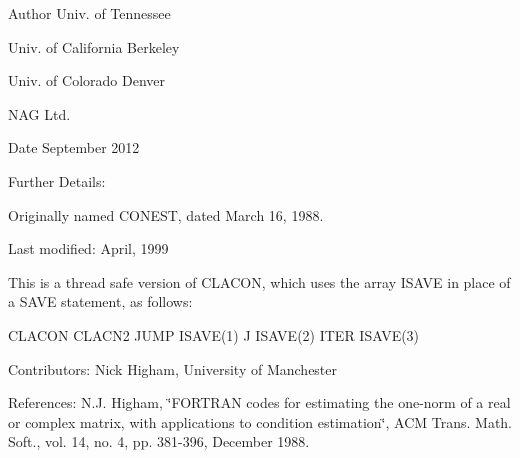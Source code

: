 \begin{DoxyAuthor}{Author}
Univ. of Tennessee 

Univ. of California Berkeley 

Univ. of Colorado Denver 

N\+A\+G Ltd. 
\end{DoxyAuthor}
\begin{DoxyDate}{Date}
September 2012 
\end{DoxyDate}
\begin{DoxyParagraph}{Further Details\+: }
\begin{DoxyVerb}  Originally named CONEST, dated March 16, 1988.

  Last modified:  April, 1999

  This is a thread safe version of CLACON, which uses the array ISAVE
  in place of a SAVE statement, as follows:

     CLACON     CLACN2
      JUMP     ISAVE(1)
      J        ISAVE(2)
      ITER     ISAVE(3)\end{DoxyVerb}
 
\end{DoxyParagraph}
\begin{DoxyParagraph}{Contributors\+: }
Nick Higham, University of Manchester 
\end{DoxyParagraph}
\begin{DoxyParagraph}{References\+: }
N.\+J. Higham, \char`\"{}\+F\+O\+R\+T\+R\+A\+N codes for estimating the one-\/norm of
  a real or complex matrix, with applications to condition estimation\char`\"{}, A\+C\+M Trans. Math. Soft., vol. 14, no. 4, pp. 381-\/396, December 1988. 
\end{DoxyParagraph}
